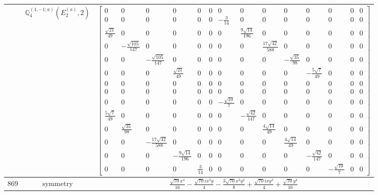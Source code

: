 \documentclass[fleqn,8pt,landscape]{jsarticle}
\begin{document}
\begin{longtable}{ccc}
$  $ & $ \mathbb{Q}_{4}^{(1,-1;a)}(E_{2}^{(a)},2) $ & $ \begin{bmatrix} 0 & 0 & 0 & 0 & 0 & 0 & 0 & 0 & 0 & 0 & 0 & 0 & 0 & 0 \\ 0 & 0 & 0 & 0 & 0 & 0 & - \frac{3}{14} & 0 & 0 & 0 & 0 & 0 & 0 & 0 \\ \frac{\sqrt{21}}{49} & 0 & 0 & 0 & 0 & 0 & 0 & \frac{9 \sqrt{14}}{196} & 0 & 0 & 0 & 0 & 0 & 0 \\ 0 & - \frac{\sqrt{105}}{147} & 0 & 0 & 0 & 0 & 0 & 0 & \frac{17 \sqrt{42}}{588} & 0 & 0 & 0 & 0 & 0 \\ 0 & 0 & - \frac{\sqrt{105}}{147} & 0 & 0 & 0 & 0 & 0 & 0 & - \frac{\sqrt{35}}{98} & 0 & 0 & 0 & 0 \\ 0 & 0 & 0 & \frac{\sqrt{21}}{49} & 0 & 0 & 0 & 0 & 0 & 0 & - \frac{5 \sqrt{7}}{49} & 0 & 0 & 0 \\ 0 & 0 & 0 & 0 & 0 & 0 & 0 & 0 & 0 & 0 & 0 & 0 & 0 & 0 \\ 0 & 0 & 0 & 0 & 0 & 0 & 0 & 0 & 0 & 0 & 0 & 0 & 0 & 0 \\ 0 & 0 & 0 & 0 & 0 & 0 & - \frac{\sqrt{10}}{7} & 0 & 0 & 0 & 0 & 0 & 0 & 0 \\ \frac{5 \sqrt{7}}{49} & 0 & 0 & 0 & 0 & 0 & 0 & - \frac{\sqrt{42}}{147} & 0 & 0 & 0 & 0 & 0 & 0 \\ 0 & \frac{\sqrt{35}}{98} & 0 & 0 & 0 & 0 & 0 & 0 & \frac{4 \sqrt{14}}{49} & 0 & 0 & 0 & 0 & 0 \\ 0 & 0 & - \frac{17 \sqrt{42}}{588} & 0 & 0 & 0 & 0 & 0 & 0 & \frac{4 \sqrt{14}}{49} & 0 & 0 & 0 & 0 \\ 0 & 0 & 0 & - \frac{9 \sqrt{14}}{196} & 0 & 0 & 0 & 0 & 0 & 0 & - \frac{\sqrt{42}}{147} & 0 & 0 & 0 \\ 0 & 0 & 0 & 0 & \frac{3}{14} & 0 & 0 & 0 & 0 & 0 & 0 & - \frac{\sqrt{10}}{7} & 0 & 0 \end{bmatrix} $ \\ \hline
$ 869 $ & $ \text{symmetry} $ & $ \frac{\sqrt{70} x^{4}}{16} - \frac{\sqrt{70} i x^{3} y}{4} - \frac{3 \sqrt{70} x^{2} y^{2}}{8} + \frac{\sqrt{70} i x y^{3}}{4} + \frac{\sqrt{70} y^{4}}{16} $ \\

\end{longtable}
\end{document}

